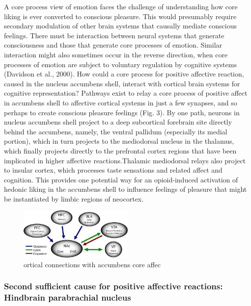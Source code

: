 \documentclass[conference]{IEEEtran}
\begin{document}
A core process view of emotion faces the challenge of
understanding how core liking is ever converted to
conscious pleasure. This would presumably require
secondary modulation of other brain systems that
causally mediate conscious feelings. There must be interaction between neural systems that generate consciousness and those that generate core processes of
emotion. Similar interaction might also sometimes occur
in the reverse direction, when core processes of emotion
are subject to voluntary regulation by cognitive systems
(Davidson et al., 2000). How could a core process for
positive affective reaction, caused in the nucleus accumbens shell, interact with cortical brain systems for
cognitive representation?
Pathways exist to relay a core process of positive
affect in accumbens shell to affective cortical systems
in just a few synapses, and so perhaps to create conscious pleasure feelings (Fig. 3). By one path, neurons
in nucleus accumbens shell project to a deep subcortical forebrain site directly behind the accumbens,
namely, the ventral pallidum (especially its medial
portion), which in turn projects to the mediodorsal
nucleus in the thalamus, which finally projects directly
to the prefrontal cortex regions that have been implicated in higher affective reactions.Thalamic mediodorsal relays also project to insular
cortex, which processes taste sensations and related
affect and cognition. This provides one potential way
for an opioid-induced activation of hedonic liking in
the accumbens shell to influence feelings of pleasure
that might be instantiated by limbic regions of neocortex.

\begin{figure}[h]
  \centering
  \includegraphics[width=0.5\textwidth]{pic-8.jpeg}
  \caption{ortical connections with accumbens
core affec}
  \label{fig:example}
\end{figure}




\subsubsection{Second sufficient cause for positive affective reactions: Hindbrain parabrachial nucleus}
\end{document}
